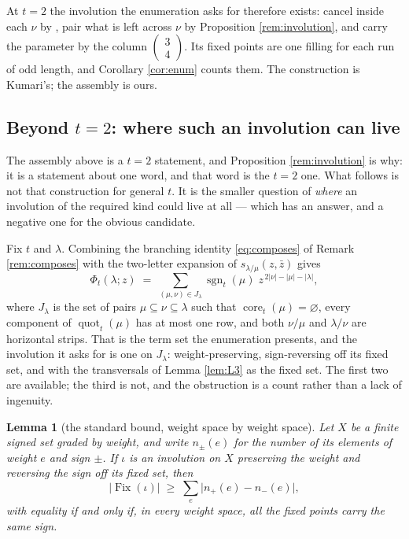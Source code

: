\documentclass[11pt,reqno]{amsart}
\theoremstyle{plain}
\newtheorem{lemma}[theorem]{Lemma}
\theoremstyle{definition}
\newcommand{\sgn}{\operatorname{sgn}}
\newcommand{\core}{\operatorname{core}}
\newcommand{\quot}{\operatorname{quot}}
\newcommand{\zb}{\bar z}
\newcommand{\Fix}{\operatorname{Fix}}
\begin{document}
At $t=2$ the involution the enumeration asks for therefore exists: cancel inside each $\nu$ by
\cite[Lemma 2.18]{KumariThesis}, pair what is left across $\nu$ by Proposition \ref{rem:involution},
and carry the parameter by the column $\left(\begin{smallmatrix}3\\4\end{smallmatrix}\right)$. Its
fixed points are one filling for each run of odd length, and Corollary \ref{cor:enum} counts them.
The construction is Kumari's; the assembly is ours.

\subsection{Beyond \texorpdfstring{$t=2$}{t=2}: where such an involution can live}\label{sec:lift}

The assembly above is a $t=2$ statement, and Proposition \ref{rem:involution} is why: it is a
statement about one word, and that word is the $t=2$ one. What follows is not that construction for
general $t$. It is the smaller question of \emph{where} an involution of the required kind could
live at all --- which has an answer, and a negative one for the obvious candidate.

Fix $t$ and $\lambda$. Combining the branching identity \eqref{eq:composes} of Remark
\ref{rem:composes} with the two-letter expansion of $s_{\lambda/\mu}(z,\zb)$ gives
\begin{equation}\label{eq:Jlambda}
\Phi_t(\lambda;z)\;=\;\sum_{(\mu,\nu)\in J_\lambda}\sgn_t(\mu)\;z^{\,2|\nu|-|\mu|-|\lambda|},
\end{equation}
where $J_\lambda$ is the set of pairs $\mu\subseteq\nu\subseteq\lambda$ such that
$\core_t(\mu)=\varnothing$, every component of $\quot_t(\mu)$ has at most one row, and both
$\nu/\mu$ and $\lambda/\nu$ are horizontal strips. That is the term set the enumeration presents,
and the involution it asks for is one on $J_\lambda$: weight-preserving, sign-reversing off its
fixed set, and with the transversals of Lemma \ref{lem:L3} as the fixed set. The first two are
available; the third is not, and the obstruction is a count rather than a lack of ingenuity.

\begin{lemma}[the standard bound, weight space by weight space]\label{lem:fixbound}
Let $X$ be a finite signed set graded by weight, and write $n_\pm(e)$ for the number of its elements
of weight $e$ and sign $\pm$. If $\iota$ is an involution on $X$ preserving the weight and reversing
the sign off its fixed set, then
\[
\bigl|\Fix(\iota)\bigr|\;\ge\;\sum_e\bigl|n_+(e)-n_-(e)\bigr|,
\]
with equality if and only if, in every weight space, all the fixed points carry the same sign.
\end{lemma}
\end{document}
